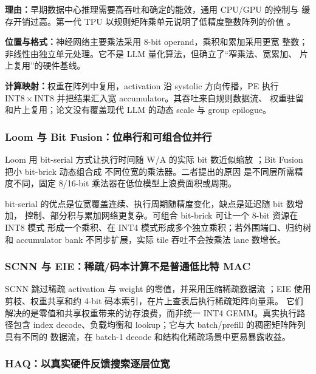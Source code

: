 \textbf{理由：}早期数据中心推理需要高吞吐和确定的能效，通用 CPU/GPU 的控制与
缓存开销过高。第一代 TPU 以规则矩阵乘单元说明了低精度整数阵列的价值
。

\textbf{位置与格式：}神经网络主要乘法采用 8-bit operand，乘积和累加采用更宽
整数；非线性由独立单元处理。它不是 LLM 量化算法，但确立了“窄乘法、宽累加、
片上复用”的硬件基线。

\textbf{计算映射：}权重在阵列中复用，activation 沿 systolic 方向传播，PE 执行
$\mathrm{INT8}\times\mathrm{INT8}$ 并把结果汇入宽 accumulator。其吞吐来自规则数据流、
权重驻留和片上复用；论文没有覆盖现代 LLM 的动态 scale 与 group epilogue。

\subsubsection{Loom 与 Bit Fusion：位串行和可组合位并行}

Loom 用 bit-serial 方式让执行时间随 W/A 的实际 bit 数近似缩放
；Bit Fusion 把小 bit-brick 动态组合成
不同位宽的乘法器。二者提出的原因
是不同层所需精度不同，固定 8/16-bit 乘法器在低位模型上浪费面积或周期。

bit-serial 的优点是位宽覆盖连续、执行周期随精度变化，缺点是延迟随 bit 数增加，
控制、部分积与累加网络更复杂。可组合 bit-brick 可让一个 8-bit 资源在 INT8 模式
形成一个乘积、在 INT4 模式形成多个独立乘积；若外围端口、归约树和 accumulator
bank 不同步扩展，实际 tile 吞吐不会按乘法 lane 数增长。

\subsubsection{SCNN 与 EIE：稀疏/码本计算不是普通低比特 MAC}

SCNN 跳过稀疏 activation 与 weight 的零值，并采用压缩稀疏数据流
；EIE 使用剪枝、权重共享和约 4-bit
码本索引，在片上查表后执行稀疏矩阵向量乘。
它们解决的是零值和共享权重带来的访存浪费，而非统一 INT4 GEMM。真实执行路径包含
index decode、负载均衡和 lookup；它与大 batch/prefill 的稠密矩阵阵列具有不同的
数据流，在 batch-1 decode 和结构化稀疏场景中更易暴露收益。

\subsubsection{HAQ：以真实硬件反馈搜索逐层位宽}

